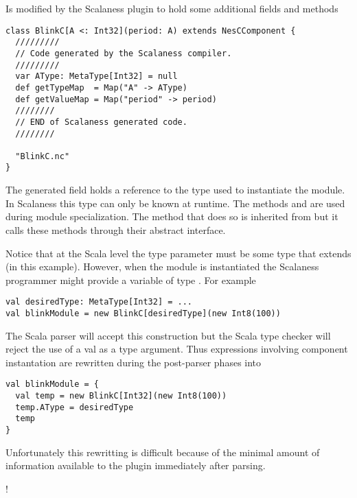 Is modified by the Scalaness plugin to hold some additional fields and methods

\singlespace
\begin{lstlisting}[language=scalaness]
class BlinkC[A <: Int32](period: A) extends NesCComponent {
  /////////
  // Code generated by the Scalaness compiler.
  /////////
  var AType: MetaType[Int32] = null
  def getTypeMap  = Map("A" -> AType)
  def getValueMap = Map("period" -> period)
  ////////
  // END of Scalaness generated code.
  ////////

  "BlinkC.nc"
}
\end{lstlisting}
\primaryspacing

The generated field  holds a reference to the type used to instantiate the
module. In Scalaness this type can only be known at runtime. The methods 
and  are used during module specialization. The method that does so is
inherited from  but it calls these methods through their abstract
interface.

Notice that at the Scala level the type parameter must be some type that extends
 (in this example). However, when the module is instantiated the
Scalaness programmer might provide a variable of type . For example

\singlespace
\begin{lstlisting}[language=scalaness]
val desiredType: MetaType[Int32] = ...
val blinkModule = new BlinkC[desiredType](new Int8(100))
\end{lstlisting}
\primaryspacing

The Scala parser will accept this construction but the Scala type checker will reject the use of
a val as a type argument. Thus expressions involving component instantation are rewritten during
the post-parser phases into

\singlespace
\begin{lstlisting}[language=scalaness]
val blinkModule = {
  val temp = new BlinkC[Int32](new Int8(100))
  temp.AType = desiredType
  temp
}
\end{lstlisting}
\primaryspacing

Unfortunately this rewritting is difficult because of the minimal amount of information
available to the plugin immediately after parsing.

\lstDeleteShortInline!

